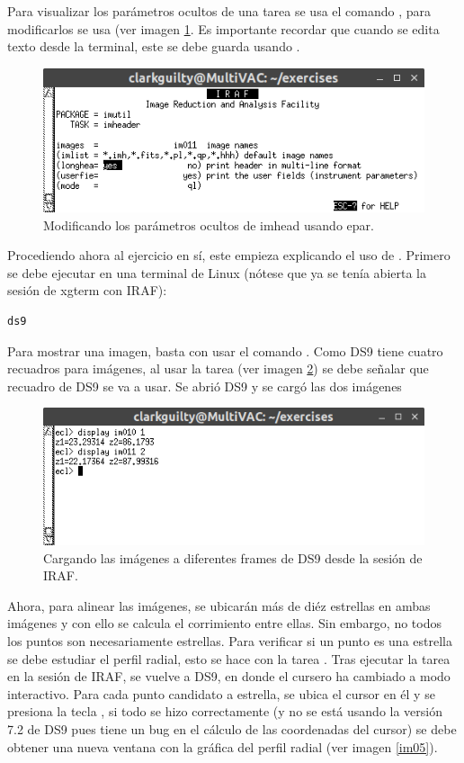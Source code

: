 \documentclass[12pt]{article}
\begin{document}
Para visualizar los parámetros ocultos de una tarea se usa el comando , para modificarlos se usa  (ver imagen \ref{im02}. Es importante recordar que cuando se edita texto desde la terminal, este se debe guarda usando . 

\begin{figure}[H]
  \centering
   \includegraphics[scale= 0.65]{im02.png}
  \caption{Modificando los parámetros ocultos de imhead usando epar.}
  \label{im02}
\end{figure}

Procediendo ahora al ejercicio en sí, este empieza explicando el uso de . Primero se debe ejecutar en una terminal de Linux (nótese que ya se tenía abierta la sesión de xgterm con IRAF):

\begin{lstlisting}[language=bash]
ds9
\end{lstlisting}

Para mostrar una imagen, basta con usar el comando . Como DS9 tiene cuatro recuadros para imágenes, al usar la tarea  (ver imagen \ref{im03}) se debe señalar que recuadro de DS9 se va a usar. Se abrió DS9 y se cargó las dos imágenes
\begin{figure}[H]
  \centering
   \includegraphics[scale= 0.65]{im03.png}
  \caption{Cargando las imágenes a diferentes frames de DS9 desde la sesión de IRAF. }
  \label{im03}
\end{figure}




Ahora, para alinear las imágenes, se ubicarán más de diéz estrellas en ambas imágenes y con ello se calcula el corrimiento entre ellas. Sin embargo, no todos los puntos son necesariamente estrellas. Para verificar si un punto es una estrella se debe estudiar el perfil radial, esto se hace con la tarea . Tras ejecutar la tarea en la sesión de IRAF, se vuelve a DS9, en donde el cursero ha cambiado a modo interactivo. Para cada punto candidato a estrella, se ubica el cursor en él y se presiona la tecla , si todo se hizo correctamente (y no se está usando la versión 7.2 de DS9 pues tiene un bug en el cálculo de las coordenadas del cursor) se debe obtener una nueva ventana con la gráfica del perfil radial (ver imagen \ref{im05}). 
\end{document}
